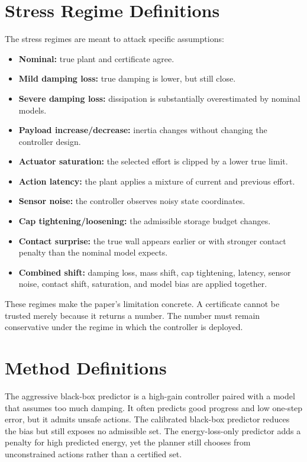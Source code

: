 \documentclass{article}
\begin{document}
\section{Stress Regime Definitions}

The stress regimes are meant to attack specific assumptions:
\begin{itemize}
    \item \textbf{Nominal:} true plant and certificate agree.
    \item \textbf{Mild damping loss:} true damping is lower, but still close.
    \item \textbf{Severe damping loss:} dissipation is substantially overestimated by nominal models.
    \item \textbf{Payload increase/decrease:} inertia changes without changing the controller design.
    \item \textbf{Actuator saturation:} the selected effort is clipped by a lower true limit.
    \item \textbf{Action latency:} the plant applies a mixture of current and previous effort.
    \item \textbf{Sensor noise:} the controller observes noisy state coordinates.
    \item \textbf{Cap tightening/loosening:} the admissible storage budget changes.
    \item \textbf{Contact surprise:} the true wall appears earlier or with stronger contact penalty than the nominal model expects.
    \item \textbf{Combined shift:} damping loss, mass shift, cap tightening, latency, sensor noise, contact shift, saturation, and model bias are applied together.
\end{itemize}
These regimes make the paper's limitation concrete. A certificate cannot be trusted merely because it returns a number. The number must remain conservative under the regime in which the controller is deployed.

\section{Method Definitions}

The aggressive black-box predictor is a high-gain controller paired with a model that assumes too much damping. It often predicts good progress and low one-step error, but it admits unsafe actions. The calibrated black-box predictor reduces the bias but still exposes no admissible set. The energy-loss-only predictor adds a penalty for high predicted energy, yet the planner still chooses from unconstrained actions rather than a certified set.
\end{document}
